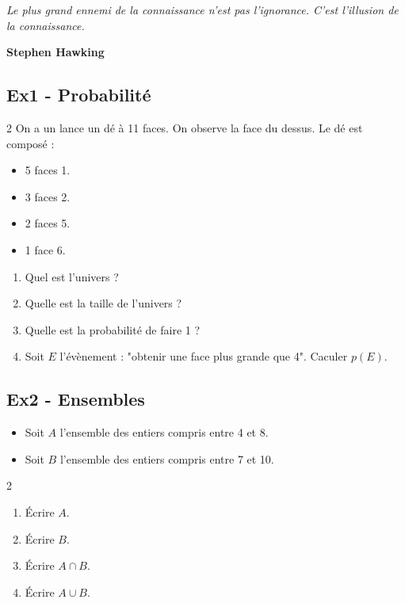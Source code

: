 



\begin{center}
  \textit{Le plus grand ennemi de la connaissance n'est pas l'ignorance. C'est l'illusion de la connaissance.} 
  
  \textbf{Stephen Hawking}
\end{center}

\subsection*{Ex1 - Probabilité}

\begin{multicols}{2}
On a un lance un dé à 11 faces. On observe la face du dessus. Le dé est composé : 
\begin{itemize}[label={$\bullet$}]
  \item 5 faces 1.
  \item 3 faces 2.
  \item 2 faces 5.
  \item 1 face 6.
\end{itemize} \columnbreak

\begin{enumerate}
  \item[1.] Quel est l'univers ?
  \item[2.] Quelle est la taille de l'univers ?
  \item[3.] Quelle est la probabilité de faire 1 ? 
  \item[4.] Soit $E$ l'évènement : "obtenir une face plus grande que 4". Caculer $p(E)$.  
\end{enumerate}
\end{multicols}

\subsection*{Ex2 - Ensembles}

\begin{itemize}[label={$\bullet$}]
  \item Soit $A$ l'ensemble des entiers compris entre 4 et 8. 
  \item Soit $B$ l'ensemble des entiers compris entre 7 et 10. 
\end{itemize}

\begin{multicols}{2}
\begin{enumerate}
  \item[1.] Écrire $A$. 
  \item[2.] Écrire $B$. \columnbreak
  \item[3.] Écrire $A \cap B$. 
  \item[4.] Écrire $A \cup B$. 
\end{enumerate}
\end{multicols}

